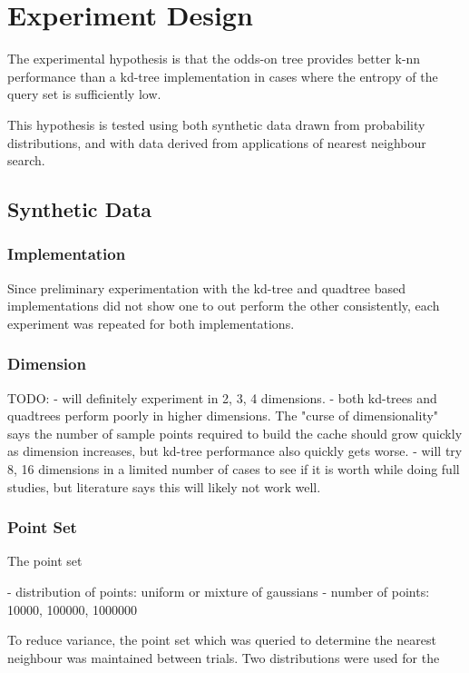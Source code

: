 \documentclass[mcs]{scsthesis}
\begin{document}
\section{Experiment Design}

The experimental hypothesis is that the odds-on tree provides better k-nn
performance than a kd-tree implementation in cases where the entropy of the
query set is sufficiently low.

This hypothesis is tested using both synthetic data drawn from probability
distributions, and with data derived from applications of nearest neighbour
search. 

\subsection{Synthetic Data}

\subsubsection{Implementation}

Since preliminary experimentation with the kd-tree and quadtree based
implementations did not show one to out perform the other consistently, each
experiment was repeated for both implementations.

\subsubsection{Dimension}

TODO:
- will definitely experiment in 2, 3, 4 dimensions.
- both kd-trees and quadtrees perform poorly in higher dimensions.  The "curse
of dimensionality" says the number of sample points required to build the cache
should grow quickly as dimension increases, but kd-tree performance also quickly
gets worse.
- will try 8, 16 dimensions in a limited number of cases to see if it is worth
while doing full studies, but literature says this will likely not work well.

\subsubsection{Point Set}

The point set

- distribution of points: uniform or mixture of gaussians
- number of points: 10000, 100000, 1000000 

To reduce variance, the point set which was queried to determine the nearest
neighbour was maintained between trials.  Two distributions were used for the
\end{document}
